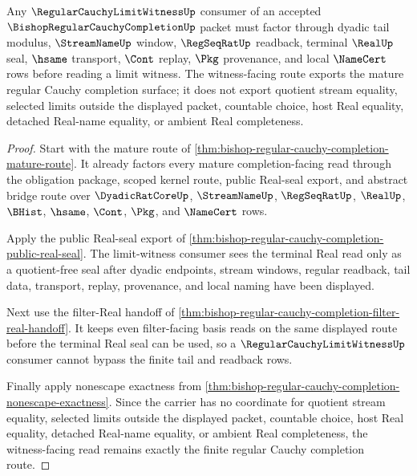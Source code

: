 \begin{theorem}
\label{thm:bishop-regular-cauchy-completion-limit-witness-route}
Any $\RegularCauchyLimitWitnessUp$ consumer of an accepted $\BishopRegularCauchyCompletionUp$ packet must factor through dyadic tail modulus, $\StreamNameUp$ window, $\RegSeqRatUp$ readback, terminal $\RealUp$ seal, $\hsame$ transport, $\Cont$ replay, $\Pkg$ provenance, and local $\NameCert$ rows before reading a limit witness. The witness-facing route exports the mature regular Cauchy completion surface; it does not export quotient stream equality, selected limits outside the displayed packet, countable choice, host Real equality, detached Real-name equality, or ambient Real completeness.
\end{theorem}
\begin{proof}
Start with the mature route of \autoref{thm:bishop-regular-cauchy-completion-mature-route}. It already factors every mature completion-facing read through the obligation package, scoped kernel route, public Real-seal export, and abstract bridge route over $\DyadicRatCoreUp$, $\StreamNameUp$, $\RegSeqRatUp$, $\RealUp$, $\BHist$, $\hsame$, $\Cont$, $\Pkg$, and $\NameCert$ rows.

Apply the public Real-seal export of \autoref{thm:bishop-regular-cauchy-completion-public-real-seal}. The limit-witness consumer sees the terminal Real read only as a quotient-free seal after dyadic endpoints, stream windows, regular readback, tail data, transport, replay, provenance, and local naming have been displayed.

Next use the filter-Real handoff of \autoref{thm:bishop-regular-cauchy-completion-filter-real-handoff}. It keeps even filter-facing basis reads on the same displayed route before the terminal Real seal can be used, so a $\RegularCauchyLimitWitnessUp$ consumer cannot bypass the finite tail and readback rows.

Finally apply nonescape exactness from \autoref{thm:bishop-regular-cauchy-completion-nonescape-exactness}. Since the carrier has no coordinate for quotient stream equality, selected limits outside the displayed packet, countable choice, host Real equality, detached Real-name equality, or ambient Real completeness, the witness-facing read remains exactly the finite regular Cauchy completion route.
\end{proof}

